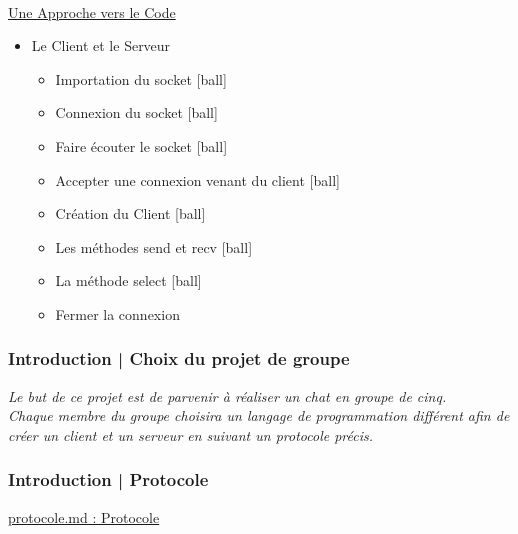\documentclass[handout]{beamer}
\begin{document}
\begin{frame}
\begin{multicols}{2}
	\large {\hyperlink{A}{\\{Une Approche vers le Code}}}
			\newline \\
		\begin{itemize}
			[ball]
			\item \small{Le Client et le Serveur}
				\begin{itemize}
				[ball]
				\item \small{Importation du socket}
				[ball]
				\item \small{Connexion du socket}
				[ball]
				\item \small{Faire écouter le socket}
				[ball]
				\item \small{Accepter une connexion venant du client}
				[ball]
				\item \small{Création du Client}
				[ball]
				\item \small{Les méthodes send et recv}
				[ball]
				\item \small{La méthode select}
				[ball]
				\item \small{Fermer la connexion}
				\end{itemize}
		\end{itemize}
	\end{multicols}
  	\end{frame}
	
	\begin{frame} [label=I]
	\frametitle{Introduction | Choix du projet de groupe}
	{\itshape Le but de ce projet est de parvenir à réaliser un chat en groupe de 	cinq.\newline \\Chaque membre du groupe choisira un langage de programmation 		différent afin 	de créer un client et un serveur en suivant un protocole 			précis.}
  	\end{frame}

	\begin{frame}
	\frametitle{Introduction | Protocole}
		\href{protocole.md}{protocole.md : Protocole}
	\end{frame}
	
\end{document}
